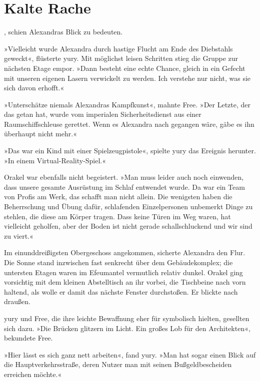 \chapter{Kalte Rache}

, schien Alexandras Blick zu bedeuten. 

»Vielleicht wurde Alexandra durch hastige Flucht am Ende des Diebstahls geweckt«, flüsterte yury. Mit möglichst leisen Schritten stieg die Gruppe zur nächsten Etage empor. »Dann besteht eine echte Chance, gleich in ein Gefecht mit unseren eigenen Lasern verwickelt zu werden. Ich verstehe nur nicht, was sie sich davon erhofft.«

»Unterschätze niemals Alexandras Kampfkunst«, mahnte Free. »Der Letzte, der das getan hat, wurde vom imperialen Sicherheitsdienst aus einer Raumschiffschleuse gerettet. Wenn es Alexandra nach gegangen wäre, gäbe es ihn überhaupt nicht mehr.«

»Das war ein Kind mit einer Spielzeugpistole«, spielte yury das Ereignis herunter. »In einem Virtual-Reality-Spiel.«

Orakel war ebenfalls nicht begeistert. »Man muss leider auch noch einwenden, dass unsere gesamte Ausrüstung im Schlaf entwendet wurde. Da war ein Team von Profis am Werk, das schafft man nicht allein. Die wenigsten haben die Beherrschung und Übung dafür, schlafenden Einzelpersonen unbemerkt Dinge zu stehlen, die diese am Körper tragen. Dass keine Türen im Weg waren, hat vielleicht geholfen, aber der Boden ist nicht gerade schallschluckend und wir sind zu viert.«

Im einunddreißigsten Obergeschoss angekommen, sicherte Alexandra den Flur. Die Sonne stand inzwischen fast senkrecht über dem Gebäudekomplex; die untersten Etagen waren im Efeumantel vermutlich relativ dunkel. Orakel ging vorsichtig mit dem kleinen Abstelltisch an ihr vorbei, die Tischbeine nach vorn haltend, als wolle er damit das nächste Fenster durchstoßen. Er blickte nach draußen.

yury und Free, die ihre leichte Bewaffnung eher für symbolisch hielten, gesellten sich dazu. »Die Brücken glitzern im Licht. Ein großes Lob für den Architekten«, bekundete Free.

»Hier lässt es sich ganz nett arbeiten«, fand yury. »Man hat sogar einen Blick auf die Hauptverkehrsstraße, deren Nutzer man mit seinen Bußgeldbescheiden erreichen möchte.«

